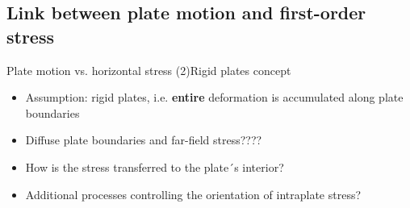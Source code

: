\documentclass[10pt,xcolor=dvipsnames, aspectratio=169]{beamer}
\begin{document}
\subsection{Link between plate motion and first-order stress}
\begin{frame}{Plate motion vs. horizontal stress (2)}{Rigid plates concept}
    \begin{minipage}[c][0pt][c]{.4\linewidth}
        \begin{itemize}[<+->]\small
            \item Assumption: rigid plates, i.e. \textbf{entire} deformation is accumulated along plate boundaries
            \item Diffuse plate boundaries and far-field stress????    
            \item How is the stress transferred to the plate´s interior?
            \item Additional processes controlling the orientation of intraplate stress?
        \end{itemize}
        \end{minipage}
        \hfill
        \begin{minipage}[c][200pt][c]{.59\linewidth}
        \centering
              
        \end{minipage}
	\end{frame}
  
  
\end{document}
